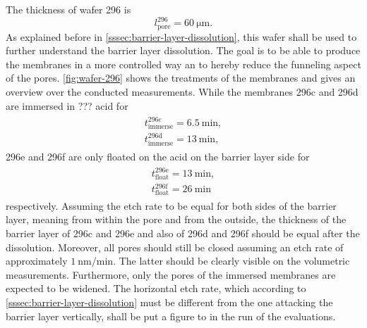 \documentclass[thesis.tex]{subfiles}
\begin{document}
        The thickness of wafer 296 is
        \begin{equation}
            l^{296}_\mathrm{pore}=\SI{60}{\micro\meter}.
        \end{equation}
        As explained before in \cref{sssec:barrier-layer-dissolution}, this wafer shall be used to further understand the barrier layer dissolution. The goal is to be able to produce the membranes in a more controlled way an to hereby reduce the funneling aspect of the pores. \cref{fig:wafer-296} shows the treatments of the membranes and gives an overview over the conducted measurements. While the membranes 296c and 296d are immersed in ??? acid for
        \begin{align}
            \begin{split}
                t^\mathrm{296c}_\mathrm{immerse}=\SI{6,5}{\minute},    \\
                t^\mathrm{296d}_\mathrm{immerse}=\SI{13}{\minute},
            \end{split}
            \label{eq:t-immerse}
        \end{align}
        296e and 296f are only floated on the acid on the barrier layer side for
        \begin{align}
            \begin{split}
                t^\mathrm{296e}_\mathrm{float}=\SI{13}{\minute}, \\
                t^\mathrm{296f}_\mathrm{float}=\SI{26}{\minute}
            \end{split}
            \label{eq:t-float}
        \end{align}
        respectively. Assuming the etch rate to be equal for both sides of the barrier layer, meaning from within the pore and from the outside, the thickness of the barrier layer of 296c and 296e and also of 296d and 296f should be equal after the dissolution. Moreover, all pores should still be closed assuming an etch rate of approximately $\SI{1}{\nano\meter\per\minute}$. The latter should be clearly visible on the volumetric measurements. Furthermore, only the pores of the immersed membranes are expected to be widened. The horizontal etch rate, which according to \cref{sssec:barrier-layer-dissolution} must be different from the one attacking the barrier layer vertically, shall be put a figure to in the run of the evaluations.

        
\end{document}
